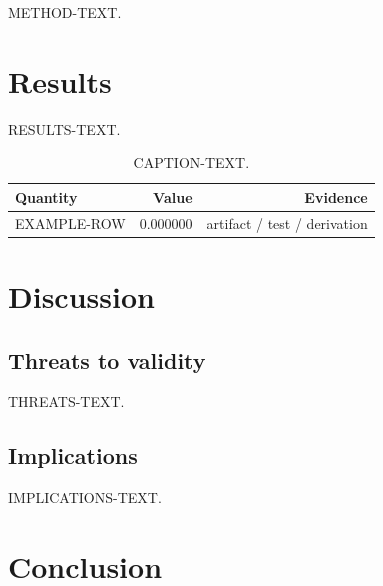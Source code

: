 \documentclass[11pt,a4paper]{article}
\begin{document}
METHOD-TEXT.

%

\section{Results}

RESULTS-TEXT.

\begin{table}[h]
\centering
\begin{tabular}{@{}lrr@{}}
\toprule
\textbf{Quantity} & \textbf{Value} & \textbf{Evidence} \\
\midrule
EXAMPLE-ROW & 0.000000 & artifact / test / derivation \\
\bottomrule
\end{tabular}
\caption{CAPTION-TEXT.}
\end{table}

\section{Discussion}

\subsection{Threats to validity}

THREATS-TEXT.

\subsection{Implications}

IMPLICATIONS-TEXT.

\section{Conclusion}
\end{document}
